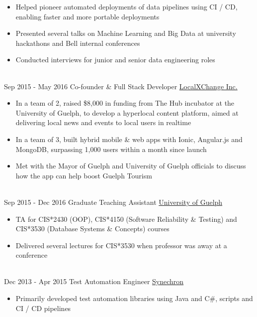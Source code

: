 \documentclass[letterpaper]{twentysecondcv} %
\begin{document}
\begin{twenty}
{\begin{itemize}
        Awards: Merit Gold (3x), Merit Platinum (2x)
        \item Helped pioneer automated deployments of data pipelines using CI / CD, enabling faster and more portable deployments
        \item Presented several talks on Machine Learning and Big Data at university hackathons and Bell internal conferences
        \item Conducted interviews for junior and senior data engineering roles
        \end{itemize}}
        \\
	\twentyitem
    	{Sep 2015 -}
		{May 2016}
        {Co-founder \& Full Stack Developer}
        {\href{http://www.localxchange.ca/}{LocalXChange Inc.}}
        {}
        {
        {\begin{itemize}
        \item In a team of 2, raised \$8,000 in funding from The Hub incubator at the University of Guelph, to develop a hyperlocal content platform, aimed at delivering local news and events to local users in realtime
        \item In a team of 3, built hybrid mobile \& web apps with Ionic, Angular.js and MongoDB, surpassing 1,000 users within a month since launch
        \item Met with the Mayor of Guelph and University of Guelph officials to discuss how the app can help boost Guelph Tourism 
    \end{itemize}}
        }
    \\   
    \twentyitem
   		{Sep 2015 -}
		{Dec 2016}
        {Graduate Teaching Assistant}
        {\href{http://www.uoguelph.ca}{University of Guelph}}
        {}
        {
        {\begin{itemize}
        \item TA for CIS*2430 (OOP), CIS*4150 (Software Reliability \& Testing) and CIS*3530 (Database Systems \& Concepts) courses
        \item Delivered several lectures for CIS*3530 when professor was away at a conference
    \end{itemize}}
        }
     \\
     \twentyitem
   		{Dec 2013 -}
		{Apr 2015}
        {Test Automation Engineer}
        {\href{http://www.synechron.com/}{Synechron}}
        {}
        {
        \begin{itemize}
        \item Primarily developed test automation libraries using Java and C\#, scripts and CI / CD pipelines

\end{itemize}}
\end{twenty}
\end{document}
